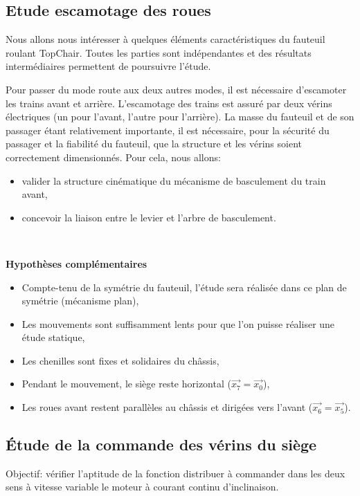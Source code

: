 \subsection{Etude escamotage des roues}

Nous allons nous intéresser à quelques éléments caractéristiques du fauteuil roulant TopChair\textregistered{}. Toutes les parties sont indépendantes et des résultats intermédiaires permettent de poursuivre l'étude.

Pour passer du mode \og route \fg{} aux deux autres modes, il est nécessaire d'escamoter les trains avant et arrière. L'escamotage des trains est assuré par deux vérins électriques (un pour l'avant, l'autre pour l'arrière). La masse du fauteuil et de son passager étant relativement importante, il est nécessaire, pour la sécurité du passager et la fiabilité du fauteuil, que la structure et les vérins soient correctement dimensionnés. Pour cela, nous allons:
\begin{itemize}
 \item valider la structure cinématique du mécanisme de basculement du train avant,
 \item concevoir la liaison entre le levier et l'arbre de basculement.
\end{itemize}

~\

\textbf{Hypothèses complémentaires}
\begin{itemize}
 \item Compte-tenu de la symétrie du fauteuil, l'étude sera réalisée dans ce plan de symétrie (mécanisme plan),
 \item Les mouvements sont suffisamment lents pour que l'on puisse réaliser une étude statique,
 \item Les chenilles sont fixes et solidaires du châssis,
 \item Pendant le mouvement, le siège reste horizontal ($\overrightarrow{x_7}=\overrightarrow{x_0}$),
 \item Les roues avant restent parallèles au châssis et dirigées vers l'avant ($\overrightarrow{x_6}=\overrightarrow{x_5}$).
\end{itemize}

\subsection{Étude de la commande des vérins du siège}

Objectif: vérifier l'aptitude de la fonction \og distribuer \fg à commander dans les deux sens à vitesse variable le moteur à courant continu d'inclinaison.

